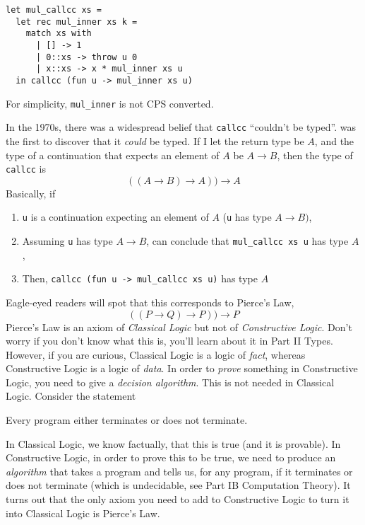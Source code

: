 \begin{code}
\label{code:mul-ocaml-callcc}
\begin{verbatim}
let mul_callcc xs = 
  let rec mul_inner xs k = 
    match xs with
      | [] -> 1
      | 0::xs -> throw u 0
      | x::xs -> x * mul_inner xs u
  in callcc (fun u -> mul_inner xs u)
\end{verbatim}
\end{code}

For simplicity, \texttt{mul\_inner} is not CPS converted. 

In the 1970s, there was a widespread belief that \texttt{callcc} ``couldn't be typed''. \citet{griffin-1990} was the first to discover that it \emph{could} be typed. If I let the return type be $A$, and the type of a continuation that expects an element of $A$ be $A \rightarrow B$, then the type of \texttt{callcc} is
\[((A \rightarrow B) \rightarrow A)) \rightarrow A\]
Basically, if
\begin{enumerate}
    \item \texttt{u} is a continuation expecting an element of $A$ (\texttt{u} has type $A \rightarrow B)$,
    \item Assuming \texttt{u} has type $A \rightarrow B$, can conclude that \texttt{mul\_callcc xs u} has type $A$,
    \item Then, \texttt{callcc (fun u -> mul\_callcc xs u)} has type $A$
\end{enumerate} 

Eagle-eyed readers will spot that this corresponds to Pierce's Law, 
\[((P \rightarrow Q) \rightarrow P)) \rightarrow P\]
Pierce's Law is an axiom of \emph{Classical Logic} but not of \emph{Constructive Logic}. Don't worry if you don't know what this is, you'll learn about it in {\sffamily Part II Types}. However, if you are curious, Classical Logic is a logic of \emph{fact}, whereas Constructive Logic is a logic of \emph{data}. In order to \emph{prove} something in Constructive Logic, you need to give a \emph{decision algorithm}. This is not needed in Classical Logic. Consider the statement 

\begin{center}
    Every program either terminates or does not terminate.
\end{center}

In Classical Logic, we know factually, that this is true (and it is provable). In Constructive Logic, in order to prove this to be true, we need to produce an \emph{algorithm} that takes a program and tells us, for any program, if it terminates or does not terminate (which is undecidable, see {\sffamily Part IB Computation Theory}). It turns out that the only axiom you need to add to Constructive Logic to turn it into Classical Logic is Pierce's Law. 

